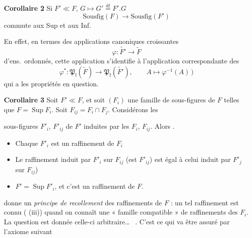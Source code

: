 \documentclass[11pt,a4paper]{article}
\begin{document}
\textbf{Corollaire 2} Si $F' \ll F$,  $G \longmapsto G' \overset{\mathrm{df}}{=} F'.G$
\begin{equation}
  \mathrm{Sousfig}(F) \longrightarrow \mathrm{Sousfig}(F') \tag{1.61}
\end{equation}
commute aux Sup et aux Inf.

 En effet, en termes des applications canoniques croissantes
\[
  \varphi : \widetilde{F'} \longrightarrow \widetilde{F}
\]
d'ens.\ ordonnés, cette application s'identifie à l'application correspondante des 
\[
  \varphi^{*} : \mathfrak{P}_{\mathrm{f}}(\widetilde{F}) \longrightarrow \mathfrak{P}_{\mathrm{f}}(\widetilde{F'}), \qquad A \longmapsto \varphi^{-1}(A) \,)
\]
qui a les propriétés en question.

\textbf{Corollaire 3} Soit $F' \ll F$, et soit $(F_i)$ une famille de sous-figures de $F$ telles que $F = \operatorname{Sup} F_i$. Soit $F_{ij} = F_i \cap F_j$. Considérons les

sous-figures $F'_i$, $F'_{ij}$ de $F'$ induites par les $F_i$, $F_{ij}$. Alors .
\begin{itemize}
  \item[(i)] Chaque $F'_i$ est un raffinement de $F_i$
  \item[(ii)] Le raffinement induit par $F'_i$ sur $F_{ij}$  (est $F'_{ij}$) est égal à celui induit par $F'_j$ sur $F_{ij}$)
  \item[(iii)] $F' = \operatorname{Sup} F'_i$, et c'est un raffinement de $F$.
\end{itemize}

\ill{} donne un \emph{principe de recollement} des raffinements de $F$ : un tel raffinement est connu ( (iii)) quand on connaît une « famille compatible » de raffinements des $F_i$. La question est  \ill{} donnée celle-ci arbitraire\ldots\ \ill{} \ill{} \ill{}. C'est ce qui va être assuré par l'axiome suivant

\end{document}
